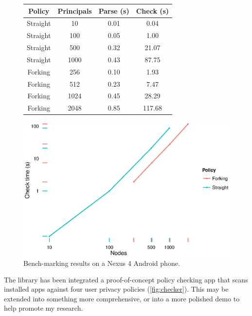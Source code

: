 \documentclass[a4paper]{scrartcl}
\begin{document}
\begin{figure}
  \begin{minipage}{0.49\linewidth}
    \footnotesize
    \begin{tabular}{cccc}
       \toprule
       Policy   & Principals & Parse (s) & Check (s) \\
       \midrule
       Straight & 10    & 0.01      & 0.04      \\
       Straight & 100   & 0.05      & 1.00      \\
       Straight & 500   & 0.32      & 21.07     \\
       Straight & 1000  & 0.43      & 87.75     \\
       \midrule
       Forking  & 256   & 0.10      & 1.93      \\
       Forking  & 512   & 0.23      & 7.47      \\
       Forking  & 1024  & 0.45      & 28.29     \\
       Forking  & 2048  & 0.85      & 117.68    \\
       \bottomrule
    \end{tabular}
  \end{minipage}
  \begin{minipage}{0.49\linewidth}
    \includegraphics[width=\linewidth]{./images/benchmarks.eps}
  \end{minipage}
  \caption{Bench-marking results on a Nexus 4 Android phone.}
  \label{fig:benchmarks}
\end{figure}

The library has been integrated a proof-of-concept policy checking app that scans installed apps against four user privacy policies (\autoref{fig:checker}).
This may be extended into something more comprehensive, or into a more polished demo to help promote my research.
\end{document}
